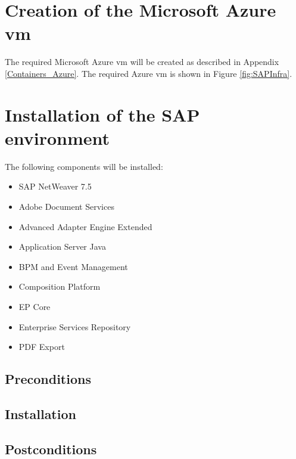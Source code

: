 \label{SAPConfig}
\section{Creation of the Microsoft Azure \acrshort{vm}}
The required Microsoft Azure \acrshort{vm} will be created as described in Appendix \ref{Containers_Azure}. 
The required Azure \acrshort{vm} is shown in Figure \ref{fig:SAPInfra}.

\section{Installation of the SAP environment}
The following components will be installed:

\begin{itemize}
    \item SAP NetWeaver 7.5
    \item Adobe Document Services
    \item Advanced Adapter Engine Extended
    \item Application Server Java
    \item BPM and Event Management
    \item Composition Platform
    \item EP Core
    \item Enterprise Services Repository
    \item PDF Export 
\end{itemize}

\subsection{Preconditions}

\subsection{Installation}

\subsection{Postconditions}

